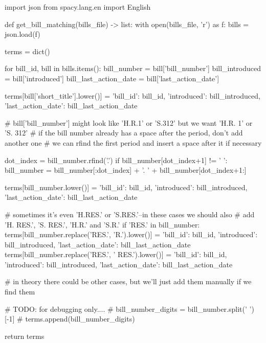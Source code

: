 

\begin{pyin}
import json
from spacy.lang.en import English
\end{pyin}


\begin{pyin}
def get_bill_matching(bills_file) -> list:
    with open(bills_file, 'r') as f:
        bills = json.load(f)

    terms = dict()

    for bill_id, bill in bills.items():
        bill_number = bill['bill_number']
        bill_introduced = bill['introduced']
        bill_last_action_date = bill['last_action_date']

        terms[bill['short_title'].lower()] = {'bill_id': bill_id,
                                      'introduced': bill_introduced,
                                      'last_action_date': bill_last_action_date}

        # bill['bill_number'] might look like 'H.R.1' or 'S.312' but we want 'H.R. 1' or 'S. 312'
        # if the bill number already has a space after the period, don't add another one
        # we can rfind the first period and insert a space after it if necessary

        dot_index = bill_number.rfind('.')
        if bill_number[dot_index+1] != ' ':
            bill_number = bill_number[:dot_index] + '. ' + bill_number[dot_index+1:]

        terms[bill_number.lower()] = {'bill_id': bill_id,
                                      'introduced': bill_introduced,
                                      'last_action_date': bill_last_action_date}

        # sometimes it's even 'H.RES.' or 'S.RES.'--in these cases we should also
        # add 'H. RES.', 'S. RES.', 'H.R.' and 'S.R.'
        if 'RES.' in bill_number:
            terms[bill_number.replace('RES.', 'R.').lower()] = {'bill_id': bill_id,
                                                        'introduced': bill_introduced,
                                                        'last_action_date': bill_last_action_date}
            terms[bill_number.replace('RES.', ' RES.').lower()] = {'bill_id': bill_id,
                                                            'introduced': bill_introduced,
                                                            'last_action_date': bill_last_action_date}

        # in theory there could be other cases, but we'll just add them manually if we find them

        # TODO: for debugging only....
        # bill_number_digits = bill_number.split(' ')[-1]
        # terms.append(bill_number_digits)

    return terms
\end{pyin}

